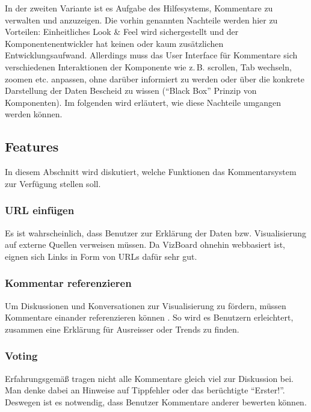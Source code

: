 \documentclass[
	headsepline,
	footsepline,
	fontsize=12pt,
	bibliography=totoc
]{scrbook}
\begin{document}
In der zweiten Variante ist es Aufgabe des Hilfesystems, Kommentare zu verwalten und anzuzeigen. Die vorhin genannten Nachteile werden hier zu Vorteilen: Einheitliches Look \& Feel wird sichergestellt und der Komponentenentwickler hat keinen oder kaum zusätzlichen Entwicklungsaufwand. Allerdings muss das User Interface für Kommentare sich verschiedenen Interaktionen der Komponente wie z.\,B. scrollen, Tab wechseln, zoomen etc. anpassen, ohne darüber informiert zu werden oder über die konkrete Darstellung der Daten Bescheid zu wissen (\enquote{Black Box} Prinzip von Komponenten). Im folgenden wird erläutert, wie diese Nachteile umgangen werden können.

\subsection{Features}
\label{section:konzeption:kommentare:features}


In diesem Abschnitt wird diskutiert, welche Funktionen das Kommentarsystem zur Verfügung stellen soll.

\subsubsection{URL einfügen}

Es ist wahrscheinlich, dass Benutzer zur Erklärung der Daten bzw. Visualisierung auf externe Quellen verweisen müssen. Da VizBoard ohnehin webbasiert ist, eignen sich Links in Form von URLs dafür sehr gut.

\subsubsection{Kommentar referenzieren}

Um Diskussionen und Konversationen zur Visualisierung zu fördern, müssen Kommentare einander referenzieren können \cite{Heer2007}. So wird es Benutzern erleichtert, zusammen eine Erklärung für Ausreisser oder Trends zu finden. 

\subsubsection{Voting}

Erfahrungsgemäß tragen nicht alle Kommentare gleich viel zur Diskussion bei. Man denke dabei an Hinweise auf Tippfehler oder das berüchtigte \enquote{Erster!}. Deswegen ist es notwendig, dass Benutzer Kommentare anderer bewerten können.
\end{document}
